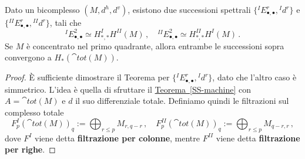 \begin{ex!}
	\begin{thm}\label{SS-bicomplex}
		Dato un bicomplesso $(M,d^{h},d^{v})$, esistono due successioni
		spettrali $\{ {}^{I}E^{r}_{\bullet,\bullet}, {}^{I}d^{r}\}$
		e $\{ {}^{II}E^{r}_{\bullet,\bullet}, {}^{II}d^{r}\}$, tali che
		\begin{equation*}
			 {}^{I}E^{2}_{\bullet,\bullet} \simeq H^{I}_{*,*}H^{II}(M) \,,
			 \quad  {}^{II}E^{2}_{\bullet,\bullet} \simeq H^{II}_{*,*}H^{I}(M)\,.
		\end{equation*}
		Se $M$ è concentrato nel primo quadrante, allora entrambe le successioni
		sopra convergono a $H_{*}(\cat{tot}(M))$.
		\begin{proof}
			È sufficiente dimostrare il Teorema per 
			$\{ {}^{I}E^{r}_{\bullet,\bullet}, {}^{I}d^{r}\}$,
			dato che l'altro caso è simmetrico. 
			L'idea è quella di sfruttare il \hyperref[SS-machine]{Teorema~\ref{SS-machine}}
			con $A = \cat{tot}(M)$ e $d$ il suo differenziale totale. 
			Definiamo quindi le filtrazioni sul complesso totale
			\begin{equation*}
				F^{I}_{p}\left( \cat{tot}(M) \right)_{q} := \bigoplus_{r \le p} M_{r,q-r}\,,
				\quad
				F^{II}_{p}\left( \cat{tot}(M) \right)_{q} := \bigoplus_{r \le p} M_{q-r,r}\,,
			\end{equation*}
			dove $F^{I}$ viene detta \textbf{filtrazione per colonne},
			mentre $F^{II}$ viene detta \textbf{filtrazione per righe}.
			
			

\end{proof}
\end{thm}
\end{ex!}
